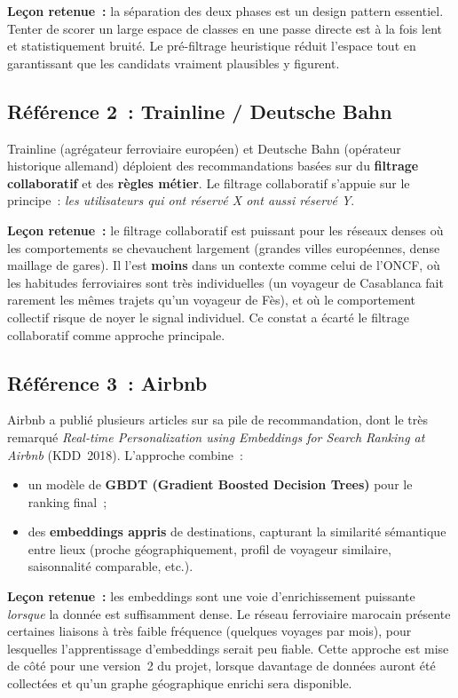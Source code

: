 \documentclass[11pt, a4paper]{article}
\begin{document}
\textbf{Leçon retenue~:} la séparation des deux phases est un design
pattern essentiel. Tenter de scorer un large espace de classes en une
passe directe est à la fois lent et statistiquement bruité. Le
pré-filtrage heuristique réduit l'espace tout en garantissant que les
candidats vraiment plausibles y figurent.

\subsection{Référence 2~: Trainline / Deutsche Bahn}

Trainline (agrégateur ferroviaire européen) et Deutsche Bahn
(opérateur historique allemand) déploient des recommandations basées
sur du \textbf{filtrage collaboratif} et des \textbf{règles métier}.
Le filtrage collaboratif s'appuie sur le principe~: \textit{les
utilisateurs qui ont réservé X ont aussi réservé Y}.

\textbf{Leçon retenue~:} le filtrage collaboratif est puissant pour les
réseaux denses où les comportements se chevauchent largement
(grandes villes européennes, dense maillage de gares). Il l'est
\textbf{moins} dans un contexte comme celui de l'ONCF, où les
habitudes ferroviaires sont très individuelles (un voyageur de Casablanca
fait rarement les mêmes trajets qu'un voyageur de Fès), et où le
comportement collectif risque de noyer le signal individuel. Ce
constat a écarté le filtrage collaboratif comme approche principale.

\subsection{Référence 3~: Airbnb}

Airbnb a publié plusieurs articles sur sa pile de recommandation, dont
le très remarqué \textit{Real-time Personalization using Embeddings for
Search Ranking at Airbnb} (KDD~2018). L'approche combine~:
\begin{itemize}
\item un modèle de \textbf{GBDT (Gradient Boosted Decision Trees)}
    pour le ranking final~;
\item des \textbf{embeddings appris} de destinations, capturant la
    similarité sémantique entre lieux (proche géographiquement, profil
    de voyageur similaire, saisonnalité comparable, etc.).
\end{itemize}

\textbf{Leçon retenue~:} les embeddings sont une voie d'enrichissement
puissante \textit{lorsque} la donnée est suffisamment dense. Le réseau
ferroviaire marocain présente certaines liaisons à très faible
fréquence (quelques voyages par mois), pour lesquelles l'apprentissage
d'embeddings serait peu fiable. Cette approche est mise de côté pour
une version~2 du projet, lorsque davantage de données auront été
collectées et qu'un graphe géographique enrichi sera disponible.
\end{document}
